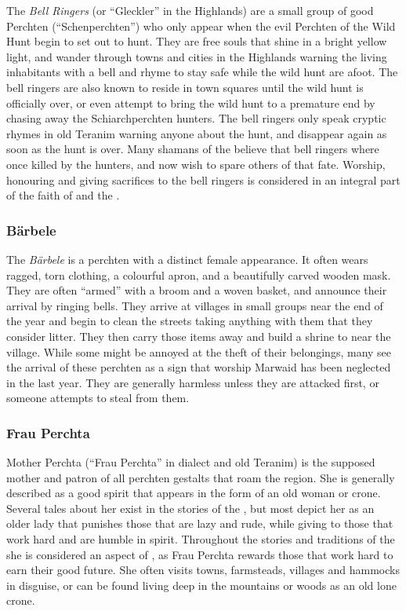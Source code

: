 The \emph{Bell Ringers} (or ``Gleckler'' in the Highlands) are a small group of
good Perchten (``Schenperchten'') who only appear when the evil Perchten
of the Wild Hunt begin to set out to hunt. They are free souls that shine
in a bright yellow light, and wander through towns and cities in the Highlands
warning the living inhabitants with a bell and rhyme to stay safe while
the wild hunt are afoot. The bell ringers are also known to reside in town
squares until the wild hunt is officially over, or even attempt to bring the
wild hunt to a premature end by chasing away the Schiarchperchten hunters. The
bell ringers only speak cryptic rhymes in old Teranim warning anyone about
the hunt, and disappear again as soon as the hunt is over. Many shamans of the
 believe that bell ringers where once killed by the
hunters, and now wish to spare others of that fate. Worship, honouring and
giving sacrifices to the bell ringers is considered in an integral part of the
faith of  and the .

\subsubsection{Bärbele}
\label{sec:Barbele}

The \emph{Bärbele} is a perchten with a distinct female appearance. It often
wears ragged, torn clothing, a colourful apron, and a beautifully carved
wooden mask. They are often ``armed'' with a broom and a woven basket, and
announce their arrival by ringing bells. They arrive at villages in small
groups near the end of the year and begin to clean the streets taking anything
with them that they consider litter. They then carry those items away and
build a shrine to  near the village. While some might be
annoyed at the theft of their belongings, many see the arrival of these
perchten as a sign that worship Marwaid has been neglected in the last
year. They are generally harmless unless they are attacked first, or someone
attempts to steal from them.

\subsubsection{Frau Perchta}
\label{sec:Frau Perchta}

Mother Perchta (``Frau Perchta'' in dialect and old Teranim) is the supposed
mother and patron of all perchten gestalts that roam the region. She is
generally described as a good spirit that appears in the form of an old woman
or crone. Several tales about her exist in the stories of the , but most depict her as an older lady that punishes those that are
lazy and rude, while giving to those that work hard and are humble in spirit.
Throughout the stories and traditions of the  she is
considered an aspect of , as Frau Perchta rewards those
that work hard to earn their good future. She often visits towns, farmsteads,
villages and hammocks in disguise, or can be found living deep in the mountains
or woods as an old lone crone.

